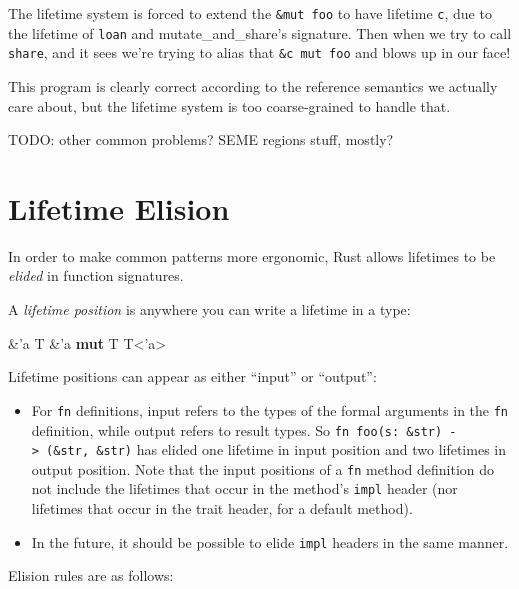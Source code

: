 \documentclass[a4paper,]{book}
\newenvironment{Shaded}{\begin{snugshade}}{\end{snugshade}}
\newcommand{\KeywordTok}[1]{\textcolor[rgb]{0.13,0.29,0.53}{\textbf{{#1}}}}
\newcommand{\OtherTok}[1]{\textcolor[rgb]{0.56,0.35,0.01}{{#1}}}
\newcommand{\NormalTok}[1]{{#1}}
\begin{document}
The lifetime system is forced to extend the \texttt{\&mut\ foo} to have
lifetime \texttt{\textquotesingle{}c}, due to the lifetime of
\texttt{loan} and mutate\_and\_share's signature. Then when we try to
call \texttt{share}, and it sees we're trying to alias that
\texttt{\&\textquotesingle{}c\ mut\ foo} and blows up in our face!

This program is clearly correct according to the reference semantics we
actually care about, but the lifetime system is too coarse-grained to
handle that.

TODO: other common problems? SEME regions stuff, mostly?

\section{Lifetime Elision}\label{sec--lifetime-elision}

In order to make common patterns more ergonomic, Rust allows lifetimes
to be \emph{elided} in function signatures.

A \emph{lifetime position} is anywhere you can write a lifetime in a
type:

\begin{Shaded}
\begin{Highlighting}[]
\NormalTok{&}\OtherTok{'a} \NormalTok{T}
\NormalTok{&}\OtherTok{'a} \KeywordTok{mut} \NormalTok{T}
\NormalTok{T<}\OtherTok{'a}\NormalTok{>}
\end{Highlighting}
\end{Shaded}

Lifetime positions can appear as either ``input'' or ``output'':

\begin{itemize}
\item
  For \texttt{fn} definitions, input refers to the types of the formal
  arguments in the \texttt{fn} definition, while output refers to result
  types. So
  \texttt{fn\ foo(s:\ \&str)\ -\textgreater{}\ (\&str,\ \&str)} has
  elided one lifetime in input position and two lifetimes in output
  position. Note that the input positions of a \texttt{fn} method
  definition do not include the lifetimes that occur in the method's
  \texttt{impl} header (nor lifetimes that occur in the trait header,
  for a default method).
\item
  In the future, it should be possible to elide \texttt{impl} headers in
  the same manner.
\end{itemize}

Elision rules are as follows:
\end{document}

